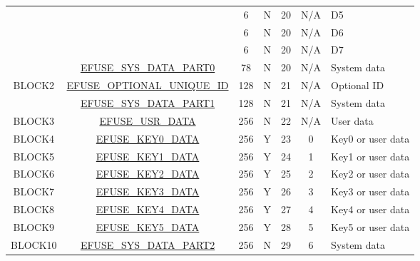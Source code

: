 \begin{longtable}[l]{ |c|c|c|c|c|c|m{2.2cm}| }
    \cline{3-7}
    & & 6 & N & 20 & N/A & D5 \\
    \cline{3-7}
    & & 6 & N & 20 & N/A & D6 \\
    \cline{3-7}
    & & 6 & N & 20 & N/A & D7 \\
    \cline{ 2-7 }
    & \hyperref[fielddesc:EFUSESYSDATAPART00]{EFUSE\_SYS\_DATA\_PART0} & 78 & N & 20 & N/A & System data \\\hline		
    BLOCK2 & \hyperref[fielddesc:EFUSEOPTIONALUNIQUEID]{EFUSE\_OPTIONAL\_UNIQUE\_ID} & 128 & N & 21 & N/A & Optional ID \\\cline{2-7}
    & \hyperref[fielddesc:EFUSESYSDATAPART1N]{EFUSE\_SYS\_DATA\_PART1} & 128 & N & 21 & N/A & System data \\\hline		
    BLOCK3 & \hyperref[fielddesc:EFUSEUSRDATAN]{EFUSE\_USR\_DATA} & 256 & N & 22 & N/A & User data \\\hline
    BLOCK4 & \hyperref[fielddesc:EFUSEKEY0DATAN]{EFUSE\_KEY0\_DATA} & 256 & Y & 23 & 0 & Key0 or user data \\
    \hline
    BLOCK5 & \hyperref[fielddesc:EFUSEKEY1DATAN]{EFUSE\_KEY1\_DATA} & 256 & Y & 24 & 1 & Key1 or user data \\
    \hline
    BLOCK6 & \hyperref[fielddesc:EFUSEKEY2DATAN]{EFUSE\_KEY2\_DATA} & 256 & Y & 25 & 2 & Key2 or user data \\    
    \hline
    BLOCK7 & \hyperref[fielddesc:EFUSEKEY3DATAN]{EFUSE\_KEY3\_DATA} & 256 & Y & 26 & 3 & Key3 or user data \\      
    \hline
    BLOCK8 & \hyperref[fielddesc:EFUSEKEY4DATAN]{EFUSE\_KEY4\_DATA} & 256 & Y & 27 & 4 & Key4 or user data \\      
    \hline
    BLOCK9 & \hyperref[fielddesc:EFUSEKEY5DATAN]{EFUSE\_KEY5\_DATA} & 256 & Y & 28 & 5 & Key5 or user data \\      
    \hline
    BLOCK10 & \hyperref[fielddesc:EFUSESYSDATAPART2N]{EFUSE\_SYS\_DATA\_PART2} & 256 & N & 29 & 6 & System data \\    
\end{longtable}